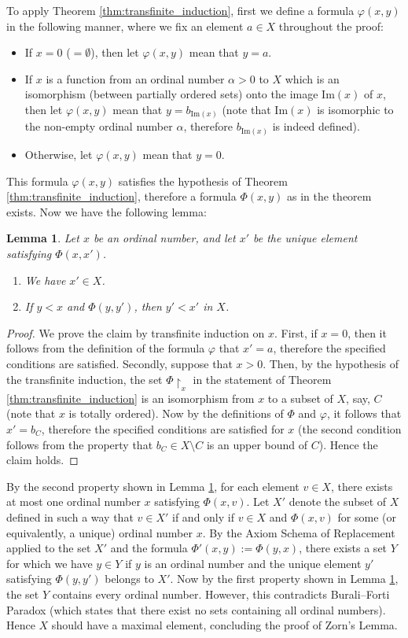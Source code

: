 \documentclass{article}
\newtheorem{lemma}{Lemma}
\begin{document}
To apply Theorem \ref{thm:transfinite_induction}, first we define a formula $\varphi(x,y)$ in the following manner, where we fix an element $a \in X$ throughout the proof:
\begin{itemize}
\item If $x = 0$ ($= \emptyset$), then let $\varphi(x,y)$ mean that $y = a$.
\item If $x$ is a function from an ordinal number $\alpha > 0$ to $X$ which is an isomorphism (between partially ordered sets) onto the image $\mathrm{Im}(x)$ of $x$, then let $\varphi(x,y)$ mean that $y = b_{\mathrm{Im}(x)}$ (note that $\mathrm{Im}(x)$ is isomorphic to the non-empty ordinal number $\alpha$, therefore $b_{\mathrm{Im}(x)}$ is indeed defined).
\item Otherwise, let $\varphi(x,y)$ mean that $y = 0$.
\end{itemize}
This formula $\varphi(x,y)$ satisfies the hypothesis of Theorem \ref{thm:transfinite_induction}, therefore a formula $\Phi(x,y)$ as in the theorem exists.
Now we have the following lemma:
\begin{lemma}
\label{lem:appendix_property_of_Phi}
Let $x$ be an ordinal number, and let $x'$ be the unique element satisfying $\Phi(x,x')$.
\begin{enumerate}
\item We have $x' \in X$.
\item If $y < x$ and $\Phi(y,y')$, then $y' < x'$ in $X$.
\end{enumerate}
\end{lemma}
\begin{proof}
We prove the claim by transfinite induction on $x$.
First, if $x = 0$, then it follows from the definition of the formula $\varphi$ that $x' = a$, therefore the specified conditions are satisfied.
Secondly, suppose that $x > 0$.
Then, by the hypothesis of the transfinite induction, the set $\Phi\!\upharpoonright_x$ in the statement of Theorem \ref{thm:transfinite_induction} is an isomorphism from $x$ to a subset of $X$, say, $C$ (note that $x$ is totally ordered).
Now by the definitions of $\Phi$ and $\varphi$, it follows that $x' = b_C$, therefore the specified conditions are satisfied for $x$ (the second condition follows from the property that $b_C \in X \setminus C$ is an upper bound of $C$).
Hence the claim holds.
\end{proof}
By the second property shown in Lemma \ref{lem:appendix_property_of_Phi}, for each element $v \in X$, there exists at most one ordinal number $x$ satisfying $\Phi(x,v)$.
Let $X'$ denote the subset of $X$ defined in such a way that $v \in X'$ if and only if $v \in X$ and $\Phi(x,v)$ for some (or equivalently, a unique) ordinal number $x$.
By the Axiom Schema of Replacement applied to the set $X'$ and the formula $\Phi'(x,y) := \Phi(y,x)$, there exists a set $Y$ for which we have $y \in Y$ if $y$ is an ordinal number and the unique element $y'$ satisfying $\Phi(y,y')$ belongs to $X'$.
Now by the first property shown in Lemma \ref{lem:appendix_property_of_Phi}, the set $Y$ contains every ordinal number.
However, this contradicts Burali--Forti Paradox (which states that there exist no sets containing all ordinal numbers).
Hence $X$ should have a maximal element, concluding the proof of Zorn's Lemma.
\end{document}
